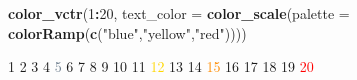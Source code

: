 \documentclass[
]{article}
\newenvironment{Shaded}{\begin{snugshade}}{\end{snugshade}}
\newcommand{\DataTypeTok}[1]{\textcolor[rgb]{0.13,0.29,0.53}{#1}}
\newcommand{\DecValTok}[1]{\textcolor[rgb]{0.00,0.00,0.81}{#1}}
\newcommand{\KeywordTok}[1]{\textcolor[rgb]{0.13,0.29,0.53}{\textbf{#1}}}
\newcommand{\NormalTok}[1]{#1}
\newcommand{\OperatorTok}[1]{\textcolor[rgb]{0.81,0.36,0.00}{\textbf{#1}}}
\newcommand{\StringTok}[1]{\textcolor[rgb]{0.31,0.60,0.02}{#1}}
\begin{document}
\begin{Shaded}
\begin{Highlighting}[]
\KeywordTok{color_vctr}\NormalTok{(}\DecValTok{1}\OperatorTok{:}\DecValTok{20}\NormalTok{, }\DataTypeTok{text_color =} \KeywordTok{color_scale}\NormalTok{(}\DataTypeTok{palette =} \KeywordTok{colorRamp}\NormalTok{(}\KeywordTok{c}\NormalTok{(}\StringTok{"blue"}\NormalTok{,}\StringTok{"yellow"}\NormalTok{,}\StringTok{"red"}\NormalTok{))))}
\end{Highlighting}
\end{Shaded}

\textcolor{ao}{1} \textcolor{palatinateblue}{2}
\textcolor{palatinateblue}{3} \textcolor{uclablue}{4}
\textcolor{slategray}{5} \textcolor{battleshipgrey}{6}
\textcolor{asparagus}{7} \textcolor{oldgold}{8} \textcolor{pear}{9}
\textcolor{aureolin}{10} \textcolor{canaryyellow}{11}
\textcolor{gold}{12} \textcolor{selectiveyellow}{13}
\textcolor{orangepeel}{14} \textcolor{darkorange}{15}
\textcolor{safetyorange}{16} \textcolor{internationalorange}{17}
\textcolor{coquelicot}{18} \textcolor{scarlet}{19} \textcolor{red}{20}
\end{document}
